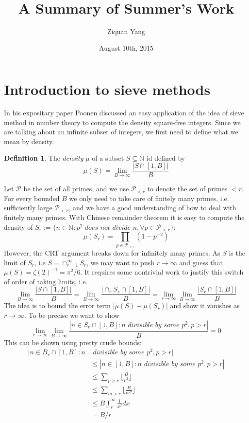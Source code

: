 \documentclass[12pt]{article}
\theoremstyle{plain}
\theoremstyle{definition}
\newtheorem{definition}[equation]{Definition}
\newcommand{\IN}{\mathbb{N}}
\newcommand{\sP}{\mathcal{P}}
\newcommand{\<}{\langle}
\renewcommand{\>}{\rangle}
\begin{document}
%

\title{A Summary of Summer's Work}
\author{Ziquan Yang}


\date{August 10th, 2015}

\maketitle


 

\setcounter{section}{0}
\section{Introduction to sieve methods}
In his expositary paper \cite{Expo} Poonen discussed an easy application of the idea of sieve method in number theory to compute the density square-free integers. Since we are talking about an infinite subset of integers, we first need to define what we mean by density. 
\begin{definition}
\label{Zdef}
The \textit{density} $\mu$ of a subset $S \subseteq \IN$ id defined by
$$\mu(S) = \lim_{B \to \infty} \frac{|S \cap [1, B]|}{B} $$
\end{definition} Let $\sP$ be the set of all primes, and we use $\sP_{<r}$ to denote the set of primes $<r$. For every bounded $B$ we only need to take care of finitely many primes, i.e. sufficiently large $\sP_{<r}$, and we have a good understanding of how to deal with finitely many primes. With Chinese remainder theorem it is easy to compute the density of $S_r := \{ n \in \IN : p^2 \textit{ does not divide } n, \forall p \in \sP_{<r} \}$: $$\mu(S_r) = \prod_{p \in \sP_{< r}} (1 - p^{-2})$$
However, the CRT argument breaks down for infinitely many primes. As $S$ is the limit of $S_r$, i.e $S = \cap_{r = 1}^\infty S_r$, we may want to push $r \to \infty$ and guess that $\mu(S) = \zeta(2)^{-1} = \pi^2/6$. It requires some nontrivial work to justify this switch of order of taking limits, i.e. 
$$ \lim_{B \to \infty} \frac{|S \cap [1, B]|}{B} = \lim_{B \to \infty} \frac{|\cap_r S_r \cap [1, B]|}{B} = \lim_{r \to \infty} \lim_{B \to \infty} \frac{|S_r \cap [1, B]|}{B}$$
The idea is to bound the error term $|\mu(S) - \mu(S_r)|$ and show it vanishes as $r \to \infty$. To be precise we want to show $$\lim_{r \to \infty} \lim_{B \to \infty} \frac{|n \in S_r \cap [1, B]: n \textit{ divisible by some }p^2, p >r|}{B} = 0$$
This can be shown using pretty crude bounds:
\begin{align*} |n \in B_r \cap [1, B]: n & \textit{ divisible by some }p^2, p >r| \\ &\le |n \in [1, B]: n \textit{ divisible by some }p^2, p >r| \\ &\le \sum_{p > r} \lfloor \frac{B}{p^2} \rfloor \\
&\le \sum_{m > r} \lfloor \frac{B}{m^2} \rfloor \\
&\le B \int_r^\infty \frac{1}{x^2} dx \\
&= B/r
\end{align*}
\end{document}
